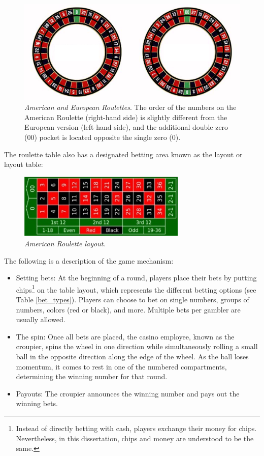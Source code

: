 \documentclass[11pt,twoside]{article}
\numberwithin{Theorem}{section}
\numberwithin{Definition}{section}
\numberwithin{Lemma}{section}
\numberwithin{Algorithm}{section}
\numberwithin{equation}{section}
\begin{document}
\begin{figure}[ht]
        \centering
        \includegraphics[width=14cm]{wheels.png}
        \caption[American and European Roulettes]{\textit{American and European Roulettes}. The order of the numbers on the American Roulette (right-hand side) is slightly different from the European version (left-hand side), and the additional double zero (00) pocket is located opposite the single zero (0).}
       
\end{figure}

The roulette table also has a designated betting area known as the layout or layout table:
\begin{figure}[ht]
\centering
\includegraphics[width=8cm]{layout.png}
\caption[American roulette layout]{\textit{American Roulette layout}. }
\end{figure}

The following is a description of the game mechanism:
\begin{itemize}
\item Setting bets: At the beginning of a round, players place their bets by putting chips\footnote{Instead of directly betting with cash, players exchange their money for chips. Nevertheless, in this dissertation, chips and money are understood to be the same.} on the table layout, which represents the different betting options (see Table \ref{bet_types}). Players can choose to bet on single numbers, groups of numbers, colors (red or black), and more. Multiple bets per gambler are usually allowed.
\item The spin: Once all bets are placed, the casino employee, known as the croupier, spins the wheel in one direction while simultaneously rolling a small ball in the opposite direction along the edge of the wheel. As the ball loses momentum, it comes to rest in one of the numbered compartments, determining the winning number for that round.
\item Payouts: The croupier announces the winning number and pays out the winning bets.
\end{itemize}
\end{document}
